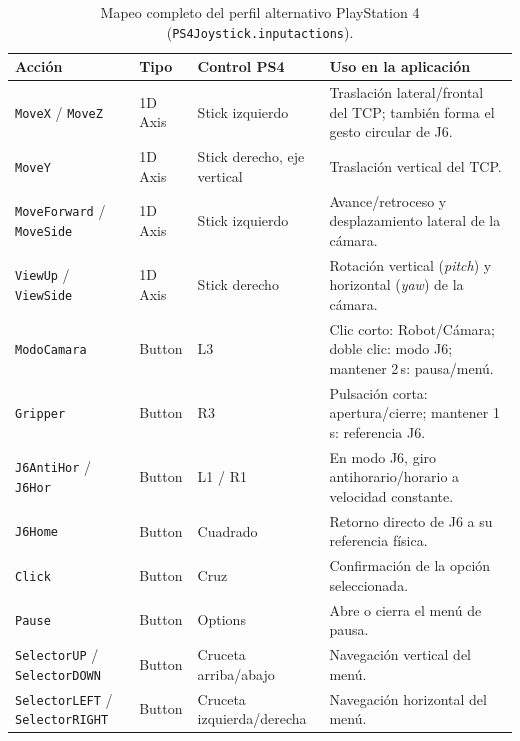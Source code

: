 \documentclass[12pt]{article}
\begin{document}
\begin{table}[H]
\centering
\small
\caption{Mapeo completo del perfil alternativo PlayStation 4 (\texttt{PS4Joystick.inputactions}).}
\label{tab:inputactions_ps4}
\begin{tabularx}{\linewidth}{|l|l|p{3cm}|X|}
\hline
\textbf{Acción} & \textbf{Tipo} & \textbf{Control PS4} & \textbf{Uso en la aplicación} \\
\hline
\texttt{MoveX} / \texttt{MoveZ}                & 1D Axis & Stick izquierdo              & Traslación lateral/frontal del TCP; también forma el gesto circular de J6. \\
\hline
\texttt{MoveY}                                 & 1D Axis & Stick derecho, eje vertical  & Traslación vertical del TCP. \\
\hline
\texttt{MoveForward} / \texttt{MoveSide}       & 1D Axis & Stick izquierdo              & Avance/retroceso y desplazamiento lateral de la cámara. \\
\hline
\texttt{ViewUp} / \texttt{ViewSide}            & 1D Axis & Stick derecho                & Rotación vertical (\textit{pitch}) y horizontal (\textit{yaw}) de la cámara. \\
\hline
\texttt{ModoCamara}                            & Button  & L3                           & Clic corto: Robot/Cámara; doble clic: modo J6; mantener 2\,s: pausa/menú. \\
\hline
\texttt{Gripper}                               & Button  & R3                           & Pulsación corta: apertura/cierre; mantener 1\,s: referencia J6. \\
\hline
\texttt{J6AntiHor} / \texttt{J6Hor}           & Button  & L1 / R1                      & En modo J6, giro antihorario/horario a velocidad constante. \\
\hline
\texttt{J6Home}                                & Button  & Cuadrado                     & Retorno directo de J6 a su referencia física. \\
\hline
\texttt{Click}                                 & Button  & Cruz                         & Confirmación de la opción seleccionada. \\
\hline
\texttt{Pause}                                 & Button  & Options                      & Abre o cierra el menú de pausa. \\
\hline
\texttt{SelectorUP} / \texttt{SelectorDOWN}   & Button  & Cruceta arriba/abajo         & Navegación vertical del menú. \\
\hline
\texttt{SelectorLEFT} / \texttt{SelectorRIGHT}& Button  & Cruceta izquierda/derecha    & Navegación horizontal del menú. \\
\hline
\end{tabularx}
\end{table}
\end{document}
